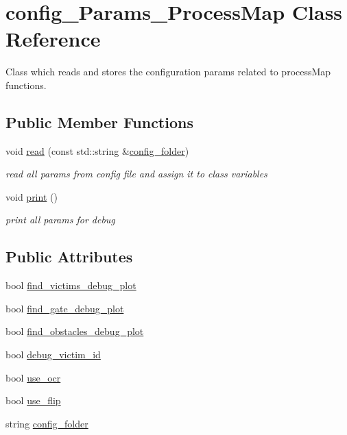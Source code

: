 \hypertarget{classconfig__Params__ProcessMap}{}\section{config\+\_\+\+Params\+\_\+\+Process\+Map Class Reference}
\label{classconfig__Params__ProcessMap}


Class which reads and stores the configuration params related to process\+Map functions.  


\subsection*{Public Member Functions}
\begin{DoxyCompactItemize}
\item 
void \hyperlink{classconfig__Params__ProcessMap_a31fb9d4c3cb96147d08e7b313e8e81e3}{read} (const std\+::string \&\hyperlink{classconfig__Params__ProcessMap_a4f13c462c22d1c92513401b800ba5b15}{config\+\_\+folder})
\begin{DoxyCompactList}\small\item\em read all params from config file and assign it to class variables \end{DoxyCompactList}\item 
void \hyperlink{classconfig__Params__ProcessMap_a6c1029c265112fc3337334da05eb1854}{print} ()
\begin{DoxyCompactList}\small\item\em print all params for debug \end{DoxyCompactList}\end{DoxyCompactItemize}
\subsection*{Public Attributes}
\begin{DoxyCompactItemize}
\item 
bool \hyperlink{classconfig__Params__ProcessMap_ae591827a509aec2c225311dff3745500}{find\+\_\+victims\+\_\+debug\+\_\+plot}
\item 
bool \hyperlink{classconfig__Params__ProcessMap_a95ef6dae3b8ea5729474e29ecab73abc}{find\+\_\+gate\+\_\+debug\+\_\+plot}
\item 
bool \hyperlink{classconfig__Params__ProcessMap_a4fd3039d8067dccf1049f5059da136b8}{find\+\_\+obstacles\+\_\+debug\+\_\+plot}
\item 
bool \hyperlink{classconfig__Params__ProcessMap_a839b04d0ee3c03af92f9abf62bdafa5d}{debug\+\_\+victim\+\_\+id}
\item 
bool \hyperlink{classconfig__Params__ProcessMap_a33441b8db8108220849c6b84381a99f7}{use\+\_\+ocr}
\item 
bool \hyperlink{classconfig__Params__ProcessMap_a5bcffdee06a89ee4157bcd524d70b1eb}{use\+\_\+flip}
\item 
string \hyperlink{classconfig__Params__ProcessMap_a4f13c462c22d1c92513401b800ba5b15}{config\+\_\+folder}
\end{DoxyCompactItemize}


